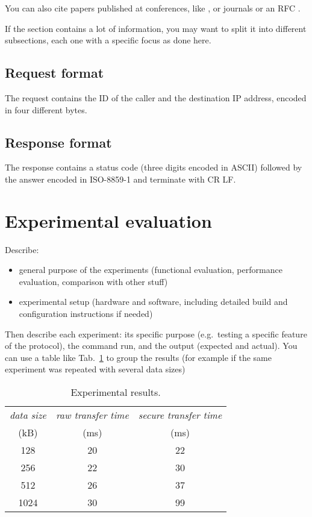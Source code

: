 \documentclass[a4paper,12pt]{article}
\def\eg{e.g.\xspace}
\def\mytab#1{Tab.~#1\xspace}
\begin{document}
You can also cite papers published at conferences, like \cite{move2008},
or journals \cite{dh} or an RFC \cite{gloss}.

If the section contains a lot of information, you may want to split it
into different subsections, each one with a specific focus as done here.

\subsection{Request format}
The request contains the ID of the caller and the destination IP address, encoded in four different bytes.

\subsection{Response format}
The response contains a status code (three digits encoded in ASCII)
followed by the answer encoded in ISO-8859-1 and terminate with CR LF.


\section{Experimental evaluation}
Describe:
\begin{itemize}
\item general purpose of the experiments (functional evaluation,
performance evaluation, comparison with other stuff)
\item experimental setup (hardware and software,
including detailed build and configuration instructions if needed)
\end{itemize}
Then describe each experiment: its specific purpose (\eg\ testing a specific
feature of the protocol), the command run, and the output (expected and actual).
You can use a table like \mytab{\ref{tab:results}} to group the results
(for example if the same experiment was repeated with several data sizes)
\begin{table}
\begin{center}
\begin{tabular}{|c|c|c|} %
\hline
{\em data size} & {\em raw transfer time} & {\em secure transfer time} \\
(kB)            & (ms)                    & (ms)\\
\hline
128  & 20  & 22 \\
256  & 22  & 30 \\
512  & 26  & 37 \\
1024 & 30  & 99 \\
\hline
\end{tabular}
\end{center}
\caption{Experimental results.}
\label{tab:results}
\end{table}
\end{document}
